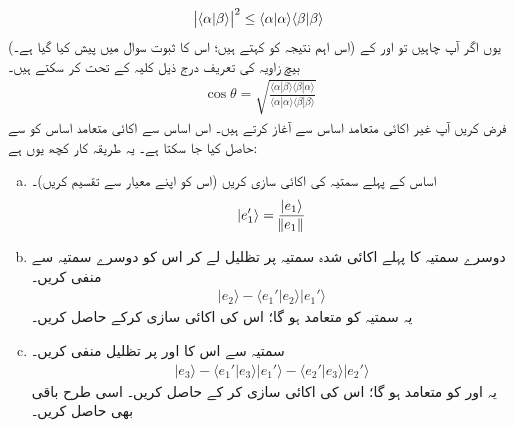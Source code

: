 
\begin{align}\label{ضمیمہ_اندرونی_ضرب_شوارز_عدم_مساوات}
\abs{\langle\alpha|\beta\rangle}^2\le \langle \alpha |\alpha \rangle \langle\beta|\beta\rangle
\end{align}
(اس  اہم نتیجہ کو  کہتے ہیں؛ اس کا ثبوت سوال  میں پیش کیا گیا ہے۔) یوں اگر آپ چاہیں تو  اور  کے بیچ زاویہ  کی تعریف درج ذیل کلیہ کے تحت کر سکتے ہیں۔
\begin{align}
\cos\theta=\sqrt{\frac{\langle\alpha|\beta\rangle\langle\beta|\alpha\rangle}{\langle\alpha|\alpha\rangle\langle\beta|\beta\rangle}}
\end{align} 
فرض کریں آپ غیر اکائی متعامد اساس   سے آغاز  کرتے  ہیں۔ اس اساس سے اکائی متعامد اساس     کو   سے حاصل کیا جا سکتا ہے۔ یہ طریقہ کار کچھ یوں ہے:
 \begin{enumerate}[a.]
 \item
 اساس  کے پہلے  سمتیہ کی  اکائی سازی کریں  (اس کو اپنے معیار سے تقسیم کریں)۔
 \begin{align*}
 |e_1'\rangle=\frac{|e_1\rangle}{\norm{e_1}}
 \end{align*}
 \item
 دوسرے سمتیہ کا پہلے    اکائی شدہ سمتیہ پر تظلیل  لے کر اس کو دوسرے سمتیہ سے منفی کریں۔
 \begin{align*}
 |e_2\rangle-\langle e_1'|e_2\rangle|e_1'\rangle
 \end{align*}
 یہ سمتیہ  کو  متعامد  ہو گا؛ اس کی  اکائی سازی کرکے    حاصل کریں۔
 \item
 سمتیہ  سے اس کا    اور  پر تظلیل منفی کریں۔
 \begin{align*}
 |e_3\rangle-\langle e_1'|e_3\rangle|e_1'\rangle-\langle e_2'|e_3\rangle|e_2'\rangle
 \end{align*}
 یہ  اور  کو متعامد  ہو گا؛ اس کی اکائی سازی کر کے    حاصل کریں۔ اسی طرح باقی بھی حاصل کریں۔
  \end{enumerate}
